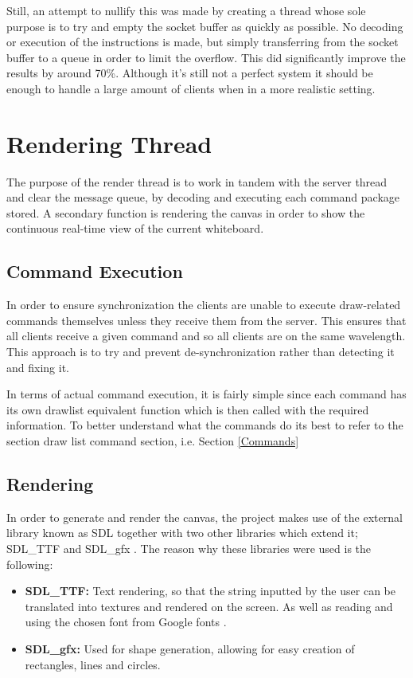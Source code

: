 \documentclass[12pt, a4paper]{report}
\begin{document}
Still, an attempt to nullify this was made by creating a thread whose sole purpose is to try and empty the socket buffer as quickly as possible. No decoding or execution of the instructions is made, but simply transferring from the socket buffer to a queue in order to limit the overflow. This did significantly improve the results by around 70\%. Although it's still not a perfect system it should be enough to handle a large amount of clients when in a more realistic setting.


\section{Rendering Thread}
The purpose of the render thread is to work in tandem with the server thread and clear the message queue, by decoding and executing each command package stored. A secondary function is rendering the canvas in order to show the continuous real-time view of the current whiteboard.

\subsection{Command Execution}
In order to ensure synchronization the clients are unable to execute draw-related commands themselves unless they receive them from the server. This ensures that all clients receive a given command and so all clients are on the same wavelength. This approach is to try and prevent de-synchronization rather than detecting it and fixing it.

In terms of actual command execution, it is fairly simple since each command has its own drawlist equivalent function which is then called with the required information. To better understand what the commands do its best to refer to the section draw list command section, i.e. Section \ref{Commands}

\subsection{Rendering}
In order to generate and render the canvas, the project makes use of the external library known as SDL \cite{SDL} together with two other libraries which extend it; SDL\_TTF \cite{SDL_TTF} and SDL\_gfx \cite{SDL2_gfx}. The reason why these libraries were used is the following:

\begin{itemize}
    \item \textbf{SDL\_TTF:} Text rendering, so that the string inputted by the user can be translated into textures and rendered on the screen. As well as reading and using the chosen font from Google fonts \cite{SPACE_MONO}.
    \item \textbf{SDL\_gfx:} Used for shape generation, allowing for easy creation of rectangles, lines and circles.
\end{itemize}
\end{document}
